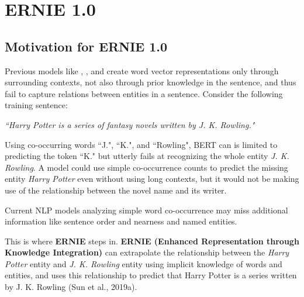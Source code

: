 \section{ERNIE 1.0} \label{sec:ERNIE_1}

\subsection{Motivation for ERNIE 1.0}

Previous models like , , and  create word vector representations only through surrounding contexts, not also through prior knowledge in the sentence, and thus fail to capture relations between entities in a sentence. Consider the following training sentence: 

{\large \textit{``Harry Potter is a series of fantasy novels written by J. K. Rowling."}}

Using co-occurring words ``J.", ``K.", and ``Rowling", BERT can is limited to predicting the token ``K." but utterly fails at recognizing the whole entity \emph{J. K. Rowling}. A model could use simple co-occurrence counts to predict the missing entity \emph{Harry Potter} even without using long contexts, but it would not be making use of the relationship between the novel name and its writer. 

Current NLP models analyzing simple word co-occurrence may miss additional information like sentence order and nearness and named entities. 



This is where \textbf{ERNIE} steps in. \textbf{ERNIE (Enhanced Representation through Knowledge Integration)} can extrapolate the relationship between the \emph{Harry Potter} entity and \emph{J. K. Rowling} entity using implicit knowledge of words and entities, and uses this relationship to predict that Harry Potter is a series written by J. K. Rowling (Sun et al., 2019a). 





